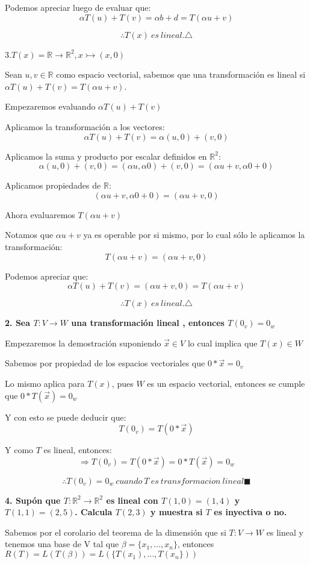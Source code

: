 \documentclass{article}
\begin{document}
Podemos apreciar luego de evaluar que: $$\alpha T(u)+T(v)=\alpha b + d=T(\alpha u + v)$$

$$\therefore T(x)\ es\ lineal.\triangle$$

3.$T(x)=\mathbb{R}\rightarrow\mathbb{R}^2, x\rightarrowtail (x,0)$

Sean $u,v \in\mathbb{R}$ como espacio vectorial, sabemos que una transformación es lineal si $\alpha T(u)+ T(v)=T(\alpha u + v)$.

Empezaremos evaluando $\alpha T(u)+ T(v)$

Aplicamos la transformación a los vectores: $$\alpha T(u)+ T(v)=\alpha(u,0)+(v,0)$$

Aplicamos la suma y producto por escalar definidos en $\mathbb{R}^2$: $$\alpha(u,0)+(v,0)=(\alpha u,\alpha 0)+(v,0)=(\alpha u + v, \alpha 0 + 0)$$

Aplicamos propiedades de $\mathbb{R}$: $$(\alpha u + v, \alpha 0 + 0)=(\alpha u + v, 0)$$

Ahora evaluaremos $T(\alpha u + v)$

Notamos que $\alpha u + v$ ya es operable por si mismo, por lo cual sólo le aplicamos la transformación: $$T(\alpha u + v)=(\alpha u + v,0)$$

Podemos apreciar que: $$\alpha T(u) + T(v)=(\alpha u + v, 0)=T(\alpha u + v)$$

$$\therefore T(x)\ es\ lineal.\triangle$$

\pagebreak
\textbf{2. Sea $T: V\rightarrow W$ una transformación lineal , entonces $T(0_{v})=0_{w}$}

Empezaremos la demostración suponiendo $\vec{x}\in V$ lo cual implica que $T(x)\in W$

Sabemos por propiedad de los espacios vectoriales que $0*\vec{x} = 0_{v}$

Lo mismo aplica para $T(x)$, pues $W$ es un espacio vectorial, entonces se cumple que  $0*T(\vec{x})=0_{w}$

Y con esto se puede deducir que: $$T(0_{v})=T(0*\vec{x})$$

Y como $T$ es lineal, entonces: $$\Rightarrow T(0_{v})=T(0*\vec{x})=0*T(\vec{x})=0_{w}$$

$$\therefore T(0_{v})=0_{w}\ cuando \ T\ es \ transformacion\ lineal\blacksquare$$


\textbf{4. Supón que $T: \mathbb{R}^2 \rightarrow \mathbb{R}^2$ es lineal con $T(1,0)=(1,4)$ y $T(1,1)=(2,5)$. Calcula $T(2,3)$ y muestra si $T$ es inyectiva o no.}

Sabemos por el corolario del teorema de la dimensión que si $T: V \rightarrow W $ es lineal y tenemos una base de V tal que $\beta = \{x_{1},...,x_{n} \}$, entonces $R(T)=L(T(\beta))=L(\{T(x_{1}),...,T(x_{n}\}))$ 
\end{document}
